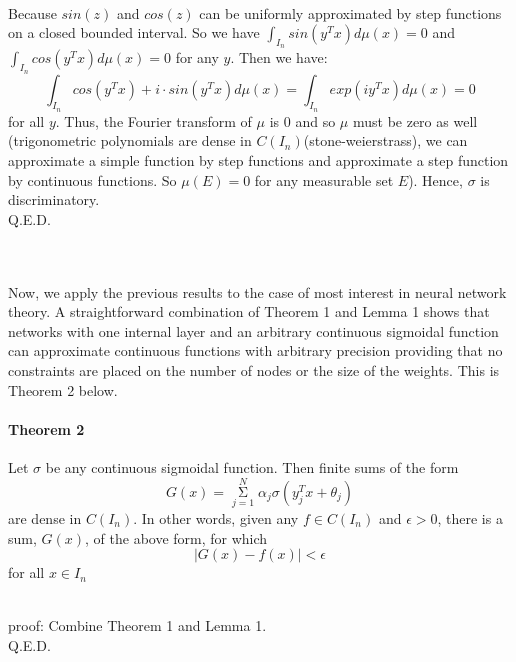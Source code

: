 ~\\Because $sin(z)$ and $cos(z)$ can be uniformly approximated by step functions on a closed bounded interval. So we have $\int_{I_n}sin(y^Tx)d\mu(x)=0$ and $\int_{I_n}cos(y^Tx)d\mu(x)=0$ for any $y$. Then we have:
$$\int_{I_n}cos(y^Tx)+i\cdot sin(y^Tx)d\mu(x)=\int_{I_n}exp(iy^Tx)d\mu(x)=0$$
for all $y$. Thus, the Fourier transform of $\mu$ is 0 and so $\mu$ must be zero as well (trigonometric polynomials are dense in $C(I_n)$(stone-weierstrass), we can approximate a simple function by step functions and approximate a step function by continuous functions. So $\mu(E)=0$ for any measurable set $E$). Hence, $\sigma$ is discriminatory.
~\\Q.E.D.

~\\~\\Now, we apply the previous results to the case of most interest in neural network theory. A straightforward combination of Theorem 1 and Lemma 1 shows that networks with one internal layer and an arbitrary continuous sigmoidal function can approximate continuous functions with arbitrary precision providing that no constraints are placed on the number of nodes or the size of the weights. This is Theorem 2 below.

\paragraph{Theorem 2}

Let $\sigma$ be any continuous sigmoidal function. Then finite sums of the form
$$G(x)=\mathop{\Sigma}\limits_{j=1}^N\alpha_j\sigma(y_j^Tx+\theta_j)$$
are dense in $C(I_n)$. In other words, given any $f\in C(I_n)$ and $\epsilon>0$, there is a sum, $G(x)$, of the above form, for which
$$|G(x)-f(x)|<\epsilon$$
for all $x\in I_n$

~\\proof: Combine Theorem 1 and Lemma 1.
~\\Q.E.D.



